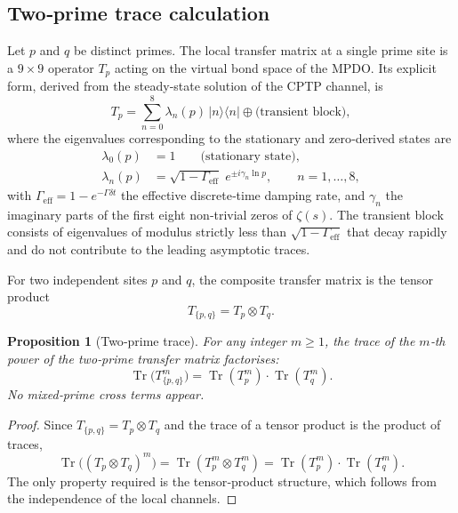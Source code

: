 \documentclass[11pt,a4paper]{article}
\newcommand{\ket}[1]{|#1\rangle}
\newcommand{\bra}[1]{\langle#1|}
\newtheorem{proposition}{Proposition}
\begin{document}
\subsection{Two‑prime trace calculation}
\label{app:two-prime}

Let $p$ and $q$ be distinct primes.  The local transfer matrix at a single prime site is a $9\times 9$ operator $T_p$ acting on the virtual bond space of the MPDO.  Its explicit form, derived from the steady‑state solution of the CPTP channel, is
\begin{equation}\label{eq:Tp-def}
T_p = \sum_{n=0}^{8} \lambda_n(p)\, \ket{n}\bra{n} \oplus \text{(transient block)},
\end{equation}
where the eigenvalues corresponding to the stationary and zero‑derived states are
\begin{align}
\lambda_0(p) &= 1 \qquad \text{(stationary state)}, \nonumber\\
\lambda_n(p) &= \sqrt{1-\Gamma_{\mathrm{eff}}}\; e^{\pm i \gamma_n \ln p}, \qquad n=1,\dots,8, \label{eq:eig-Tp}
\end{align}
with $\Gamma_{\mathrm{eff}} = 1 - e^{-\Gamma \delta t}$ the effective discrete‑time damping rate, and $\gamma_n$ the imaginary parts of the first eight non‑trivial zeros of $\zeta(s)$.  The transient block consists of eigenvalues of modulus strictly less than $\sqrt{1-\Gamma_{\mathrm{eff}}}$ that decay rapidly and do not contribute to the leading asymptotic traces.

For two independent sites $p$ and $q$, the composite transfer matrix is the tensor product
\begin{equation}
T_{\{p,q\}} = T_p \otimes T_q .
\end{equation}

\begin{proposition}[Two‑prime trace]\label{prop:two-prime-trace}
For any integer $m \ge 1$, the trace of the $m$‑th power of the two‑prime transfer matrix factorises:
\begin{equation}
\operatorname{Tr}\bigl(T_{\{p,q\}}^m\bigr) = \operatorname{Tr}(T_p^m) \cdot \operatorname{Tr}(T_q^m).
\end{equation}
No mixed‑prime cross terms appear.
\end{proposition}

\begin{proof}
Since $T_{\{p,q\}} = T_p \otimes T_q$ and the trace of a tensor product is the product of traces,
\[
\operatorname{Tr}\bigl((T_p \otimes T_q)^m\bigr) = \operatorname{Tr}(T_p^m \otimes T_q^m) = \operatorname{Tr}(T_p^m) \cdot \operatorname{Tr}(T_q^m).
\]
The only property required is the tensor‑product structure, which follows from the independence of the local channels.
\end{proof}
\end{document}
